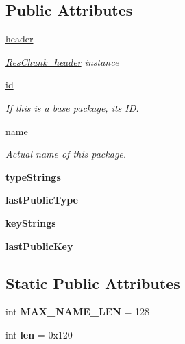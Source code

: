 \subsection*{Public Attributes}
\begin{DoxyCompactItemize}
\item 
\mbox{\hyperlink{classtable_1_1ResTable__package__header_ab1b00c59b78bb166b4badd2bd8349986}{header}}
\begin{DoxyCompactList}\small\item\em \mbox{\hyperlink{}{Res\+Chunk\+\_\+header}} instance \end{DoxyCompactList}\item 
\mbox{\hyperlink{classtable_1_1ResTable__package__header_aec6d0c7306dc2db3cffe486b13b32710}{id}}
\begin{DoxyCompactList}\small\item\em If this is a base package, its ID. \end{DoxyCompactList}\item 
\mbox{\hyperlink{classtable_1_1ResTable__package__header_ac1a009f4b944a30835e07f3e0f204161}{name}}
\begin{DoxyCompactList}\small\item\em Actual name of this package. \end{DoxyCompactList}\item 
\mbox{\label{classtable_1_1ResTable__package__header_a3ed2fa42e7bbfa95fde8f29401669b46}} 
{\bfseries type\+Strings}
\item 
\mbox{\label{classtable_1_1ResTable__package__header_ad23e253e7d46121e1c9a2a063a7b994d}} 
{\bfseries last\+Public\+Type}
\item 
\mbox{\label{classtable_1_1ResTable__package__header_ad555dcd23e72e2cb89c3b6ae77148a02}} 
{\bfseries key\+Strings}
\item 
\mbox{\label{classtable_1_1ResTable__package__header_aa92a5fe449595cac7ed637a52a2d678a}} 
{\bfseries last\+Public\+Key}
\end{DoxyCompactItemize}
\subsection*{Static Public Attributes}
\begin{DoxyCompactItemize}
\item 
\mbox{\label{classtable_1_1ResTable__package__header_af0c7dad1f15c6ca3fdaf047e8320ee47}} 
int {\bfseries M\+A\+X\+\_\+\+N\+A\+M\+E\+\_\+\+L\+EN} = 128
\item 
\mbox{\label{classtable_1_1ResTable__package__header_abd6a1b1d3eb86e9b466293af8526dc92}} 
int {\bfseries len} = 0x120
\end{DoxyCompactItemize}


